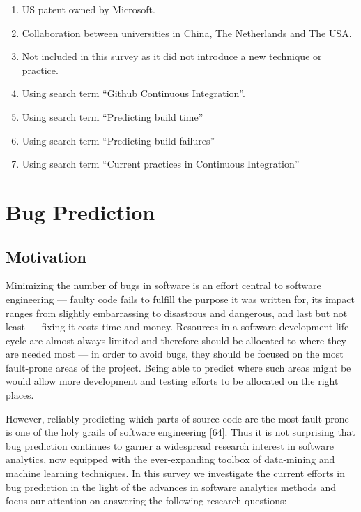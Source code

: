 \documentclass[]{book}
\providecommand{\tightlist}{%
  \setlength{\itemsep}{0pt}\setlength{\parskip}{0pt}}
\begin{document}
\begin{enumerate}
\def\labelenumi{\arabic{enumi}.}
\tightlist
\item
  US patent owned by Microsoft.
\item
  Collaboration between universities in China, The Netherlands and The
  USA.
\item
  Not included in this survey as it did not introduce a new technique or
  practice.
\item
  Using search term ``Github Continuous Integration''.
\item
  Using search term ``Predicting build time''
\item
  Using search term ``Predicting build failures''
\item
  Using search term ``Current practices in Continuous Integration''
\end{enumerate}

\chapter{Bug Prediction}\label{bug-prediction}

\section{Motivation}\label{motivation-2}

Minimizing the number of bugs in software is an effort central to
software engineering --- faulty code fails to fulfill the purpose it was
written for, its impact ranges from slightly embarrassing to disastrous
and dangerous, and last but not least --- fixing it costs time and
money. Resources in a software development life cycle are almost always
limited and therefore should be allocated to where they are needed most
--- in order to avoid bugs, they should be focused on the most
fault-prone areas of the project. Being able to predict where such areas
might be would allow more development and testing efforts to be
allocated on the right places.

However, reliably predicting which parts of source code are the most
fault-prone is one of the holy grails of software engineering
{[}\protect\hyperlink{ref-DAmbros2012}{64}{]}. Thus it is not surprising
that bug prediction continues to garner a widespread research interest
in software analytics, now equipped with the ever-expanding toolbox of
data-mining and machine learning techniques. In this survey we
investigate the current efforts in bug prediction in the light of the
advances in software analytics methods and focus our attention on
answering the following research questions:
\end{document}

